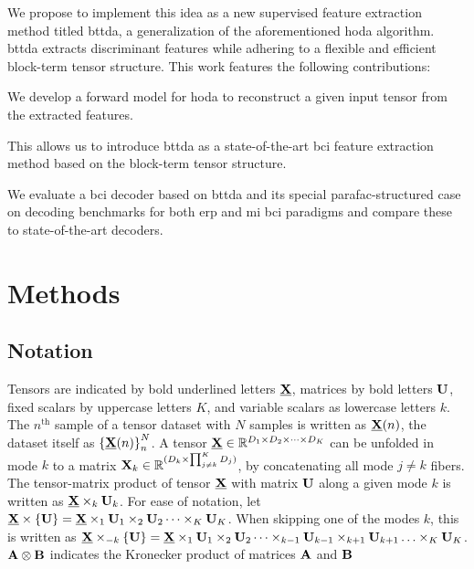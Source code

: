 \documentclass[twocolumn]{article}
\begin{document}
We propose to implement this idea as a new supervised feature
extraction method titled \ac{bttda}, a generalization of the aforementioned
\ac{hoda} algorithm.
\Ac{bttda} extracts discriminant features while adhering to a
flexible and efficient block-term tensor structure.
This work features the following contributions:
\begin{enumerate*}[label={\arabic*)}]
	\item We develop a forward model for \ac{hoda} to reconstruct a
	      given input tensor from the extracted features.
	\item This allows us to introduce \ac{bttda} as a state-of-the-art \ac{bci}
	      feature extraction method based on the block-term tensor structure.
	\item We evaluate a \ac{bci} decoder based on \ac{bttda} and its special
	      \ac{parafac}-structured case on decoding benchmarks for both \ac{erp}
	      and \ac{mi}
	      \ac{bci} paradigms and compare these to state-of-the-art decoders.
\end{enumerate*}

\section{Methods}

\subsection{Notation}
Tensors are indicated by bold underlined letters $\ten{X}$, matrices by bold
letters $\mat{U}$, fixed scalars by uppercase letters $K$, and variable
scalars as lowercase letters $k$.
The $n^\text{th}$ sample of a tensor dataset with $N$ samples is written as
$\ten{X}(n)$, the dataset itself as ${\{\ten{X}(n)\}}_n^N$.
A tensor $\ten{X}\in \mathbb{R}^{D_1\times D_2 \times \cdots \times D_K}$ can be
unfolded in mode $k$ to a matrix
$\mat{X}_k\in\mathbb{R}^{(D_k\times\prod_{j\neq k}^K D_j)}$, by concatenating
all mode $j\neq k$ fibers.
The tensor-matrix product of tensor $\ten{X}$ with matrix $\mat{U}$ along a
given mode $k$ is written as $\ten{X}\mpr{\mat{U}}{k}$. For ease of notation, let
$\ten{X}\mmpr{\mat{U}} =
	\ten{X}\mpr{\mat{U}}{1}\mpr{\mat{U}}{2}\cdots\mpr{\mat{U}}{K}$.
When skipping one of the modes $k$, this is
written as $\ten{X}\mmprs{\mat{U}}{k} =
	\ten{X}\mpr{\mat{U}}{1}\mpr{\mat{U}}{2}\cdots\mpr{\mat{U}}{k-1}\mpr{\mat{U}}{k+1}\ldots\mpr{\mat{U}}{K}$.
$\mat{A}\otimes\mat{B}$ indicates the Kronecker product of matrices $\mat{A}$ and $\mat{B}$
\end{document}
